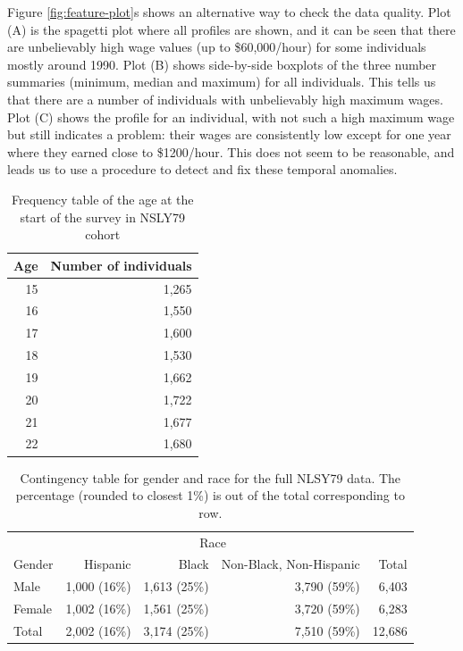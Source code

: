 \documentclass{article}
\begin{document}
Figure \ref{fig:feature-plot}s shows an alternative way to check the data quality. Plot (A) is the spagetti plot where all profiles are shown, and it can be seen that there are unbelievably high wage values (up to \$60,000/hour) for some individuals mostly around 1990. Plot (B) shows side-by-side boxplots of the three number summaries (minimum, median and maximum) for all individuals. This tells us that there are a number of individuals with unbelievably high maximum wages. Plot (C) shows the profile for an individual, with not such a high maximum wage but still indicates a problem: their wages are consistently low except for one year where they earned close to \$1200/hour. This does not seem to be reasonable, and leads us to use a procedure to detect and fix these temporal anomalies.

\begin{table}

\caption{\label{tab:age-table}Frequency table of the age at the start of the survey in NSLY79 cohort}
\centering
\begin{tabular}[t]{rr}
\toprule
Age & Number of individuals\\
\midrule
15 & 1,265\\
16 & 1,550\\
17 & 1,600\\
18 & 1,530\\
19 & 1,662\\
20 & 1,722\\
21 & 1,677\\
22 & 1,680\\
\bottomrule
\end{tabular}
\end{table}

\begin{table}

\caption{\label{tab:gender-race-table}Contingency table for gender and race for the full NLSY79 data. The percentage (rounded to closest 1\%) is out of the total corresponding to row.}
\centering
\begin{tabular}[t]{lrrrr}
\toprule
\multicolumn{1}{c}{ } & \multicolumn{3}{c}{Race} & \multicolumn{1}{c}{ } \\
\cmidrule(l{3pt}r{3pt}){2-4}
Gender & Hispanic & Black & Non-Black, Non-Hispanic & Total\\
\midrule
Male & 1,000 (16\%) & 1,613 (25\%) & 3,790 (59\%) & 6,403\\
Female & 1,002 (16\%) & 1,561 (25\%) & 3,720 (59\%) & 6,283\\
\midrule
Total & 2,002 (16\%) & 3,174 (25\%) & 7,510 (59\%) & 12,686\\
\bottomrule
\end{tabular}
\end{table}
\end{document}
